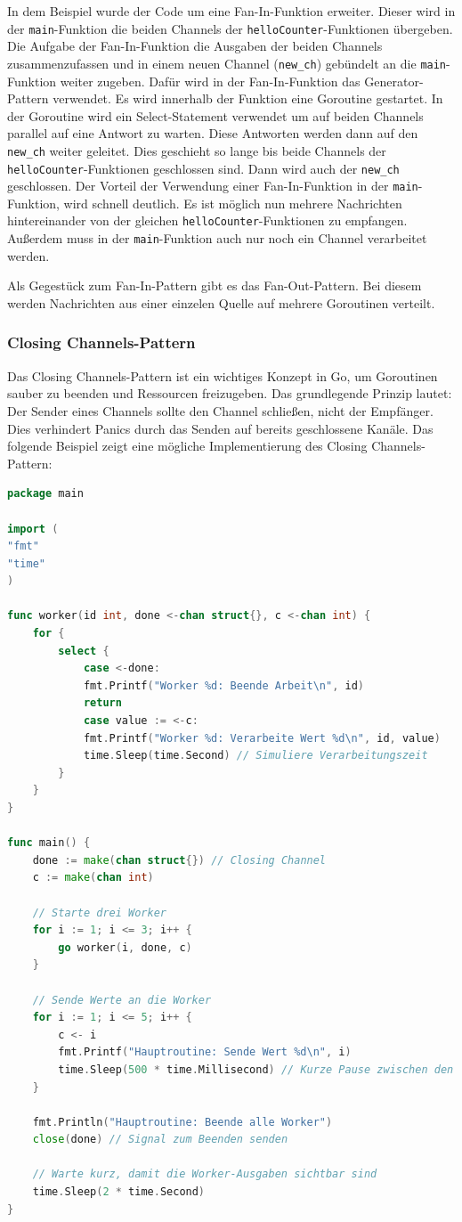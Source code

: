 \documentclass[fontsize=12pt,paper=a4,twoside=semi,parskip=half-,headsepline,headinclude]{scrreprt}
\begin{document}
In dem Beispiel wurde der Code um eine Fan-In-Funktion erweiter. Dieser wird in der \texttt{main}-Funktion die beiden Channels der \texttt{helloCounter}-Funktionen übergeben. Die Aufgabe der Fan-In-Funktion die Ausgaben der beiden Channels zusammenzufassen und in einem neuen Channel (\texttt{new\_ch}) gebündelt an die \texttt{main}-Funktion weiter zugeben. Dafür wird in der Fan-In-Funktion das Generator-Pattern verwendet. Es wird innerhalb der Funktion eine Goroutine gestartet. In der Goroutine wird ein Select-Statement verwendet um auf beiden Channels parallel auf eine Antwort zu warten. Diese Antworten werden dann auf den \texttt{new\_ch} weiter geleitet. Dies geschieht so lange bis beide Channels der \texttt{helloCounter}-Funktionen geschlossen sind. Dann wird auch der \texttt{new\_ch} geschlossen. Der Vorteil der Verwendung einer Fan-In-Funktion in der \texttt{main}-Funktion, wird schnell deutlich. Es ist möglich nun mehrere Nachrichten hintereinander von der gleichen \texttt{helloCounter}-Funktionen zu empfangen. Außerdem muss in der \texttt{main}-Funktion auch nur noch ein Channel verarbeitet werden. 

Als Gegestück zum Fan-In-Pattern gibt es das Fan-Out-Pattern. Bei diesem werden Nachrichten aus einer einzelen Quelle auf mehrere Goroutinen verteilt.

\subsubsection{Closing Channels-Pattern}

Das Closing Channels-Pattern ist ein wichtiges Konzept in Go, um Goroutinen sauber zu beenden und Ressourcen freizugeben. Das grundlegende Prinzip lautet: Der Sender eines Channels sollte den Channel schließen, nicht der Empfänger. Dies verhindert Panics durch das Senden auf bereits geschlossene Kanäle. Das folgende Beispiel zeigt eine mögliche Implementierung des Closing Channels-Pattern:

\begin{lstlisting}[language=Go,extendedchars=true]
package main

import (
"fmt"
"time"
)

func worker(id int, done <-chan struct{}, c <-chan int) {
	for {
		select {
			case <-done:
			fmt.Printf("Worker %d: Beende Arbeit\n", id)
			return
			case value := <-c:
			fmt.Printf("Worker %d: Verarbeite Wert %d\n", id, value)
			time.Sleep(time.Second) // Simuliere Verarbeitungszeit
		}
	}
}

func main() {
	done := make(chan struct{}) // Closing Channel
	c := make(chan int)
	
	// Starte drei Worker
	for i := 1; i <= 3; i++ {
		go worker(i, done, c)
	}
	
	// Sende Werte an die Worker
	for i := 1; i <= 5; i++ {
		c <- i
		fmt.Printf("Hauptroutine: Sende Wert %d\n", i)
		time.Sleep(500 * time.Millisecond) // Kurze Pause zwischen den Sendungen
	}
	
	fmt.Println("Hauptroutine: Beende alle Worker")
	close(done) // Signal zum Beenden senden
	
	// Warte kurz, damit die Worker-Ausgaben sichtbar sind
	time.Sleep(2 * time.Second)
}
\end{lstlisting}
\end{document}
